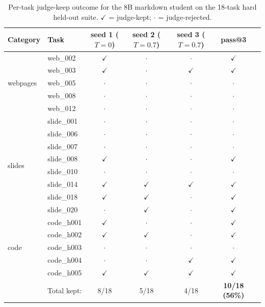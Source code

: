 \documentclass[11pt]{article}
\begin{document}
\begin{table}[ht]
\centering
\caption{Per-task judge-keep outcome for the 8B markdown student on the 18-task hard held-out suite. $\checkmark$ = judge-kept; $\cdot$ = judge-rejected.}
\label{tab:per-task-md}
\small
\begin{tabular}{llccccc}
\toprule
Category & Task & seed 1 ($T{=}0$) & seed 2 ($T{=}0.7$) & seed 3 ($T{=}0.7$) & pass@3 \\
\midrule
\multirow{5}{*}{webpages} & web\_002 & $\checkmark$ & $\cdot$ & $\cdot$ & $\checkmark$ \\
& web\_003 & $\checkmark$ & $\cdot$ & $\checkmark$ & $\checkmark$ \\
& web\_005 & $\cdot$ & $\cdot$ & $\cdot$ & $\cdot$ \\
& web\_008 & $\cdot$ & $\cdot$ & $\cdot$ & $\cdot$ \\
& web\_012 & $\cdot$ & $\cdot$ & $\cdot$ & $\cdot$ \\
\midrule
\multirow{8}{*}{slides} & slide\_001 & $\cdot$ & $\cdot$ & $\cdot$ & $\cdot$ \\
& slide\_006 & $\cdot$ & $\cdot$ & $\cdot$ & $\cdot$ \\
& slide\_007 & $\cdot$ & $\cdot$ & $\cdot$ & $\cdot$ \\
& slide\_008 & $\checkmark$ & $\cdot$ & $\cdot$ & $\checkmark$ \\
& slide\_010 & $\cdot$ & $\cdot$ & $\cdot$ & $\cdot$ \\
& slide\_014 & $\checkmark$ & $\checkmark$ & $\checkmark$ & $\checkmark$ \\
& slide\_018 & $\checkmark$ & $\checkmark$ & $\cdot$ & $\checkmark$ \\
& slide\_020 & $\cdot$ & $\checkmark$ & $\cdot$ & $\checkmark$ \\
\midrule
\multirow{5}{*}{code} & code\_h001 & $\checkmark$ & $\cdot$ & $\cdot$ & $\checkmark$ \\
& code\_h002 & $\checkmark$ & $\checkmark$ & $\cdot$ & $\checkmark$ \\
& code\_h003 & $\cdot$ & $\cdot$ & $\cdot$ & $\cdot$ \\
& code\_h004 & $\cdot$ & $\cdot$ & $\checkmark$ & $\checkmark$ \\
& code\_h005 & $\checkmark$ & $\checkmark$ & $\checkmark$ & $\checkmark$ \\
\midrule
\multicolumn{2}{r}{Total kept:} & 8/18 & 5/18 & 4/18 & \textbf{10/18 (56\%)} \\
\bottomrule
\end{tabular}
\end{table}
\end{document}
